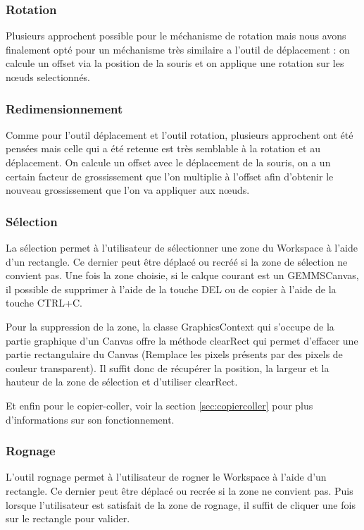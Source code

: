 \subsubsection{Rotation}
Plusieurs approchent possible pour le méchanisme de rotation mais nous avons finalement opté pour un méchanisme très similaire a l'outil de déplacement : on calcule un offset via la position de la souris et on applique une rotation sur les n\oe uds selectionnés.
\subsubsection{Redimensionnement}
Comme pour l'outil déplacement et l'outil rotation, plusieurs approchent ont été pensées mais celle qui a été retenue est très semblable à la rotation et au déplacement. On calcule un offset avec le déplacement de la souris, on a un certain facteur de grossissement que l'on multiplie à l'offset afin d'obtenir le nouveau grossissement que l'on va appliquer aux n\oe uds.
\subsubsection{Sélection}
\label{sec:selection}
La sélection permet à l'utilisateur de sélectionner une zone du Workspace à l'aide d'un rectangle. Ce dernier peut être déplacé ou recréé si la zone de sélection ne convient pas. Une fois la zone choisie, si le calque courant est un GEMMSCanvas, il possible de supprimer à l'aide de la touche DEL ou de copier à l'aide de la touche CTRL+C.

Pour la suppression de la zone, la classe GraphicsContext qui s'occupe de la partie graphique d'un Canvas offre la méthode clearRect qui permet d'effacer une partie rectangulaire du Canvas (Remplace les pixels présents par des pixels de couleur transparent). Il suffit donc de récupérer la position, la largeur et la hauteur de la zone de sélection et d'utiliser clearRect.

Et enfin pour le copier-coller, voir la section \ref{sec:copiercoller} pour plus d'informations sur son fonctionnement.

\subsubsection{Rognage}
L'outil rognage permet à l'utilisateur de rogner le Workspace à l'aide d'un rectangle. Ce dernier peut être déplacé ou recrée si la zone ne convient pas. Puis lorsque l'utilisateur est satisfait de la zone de rognage, il suffit de cliquer une fois sur le rectangle pour valider.

